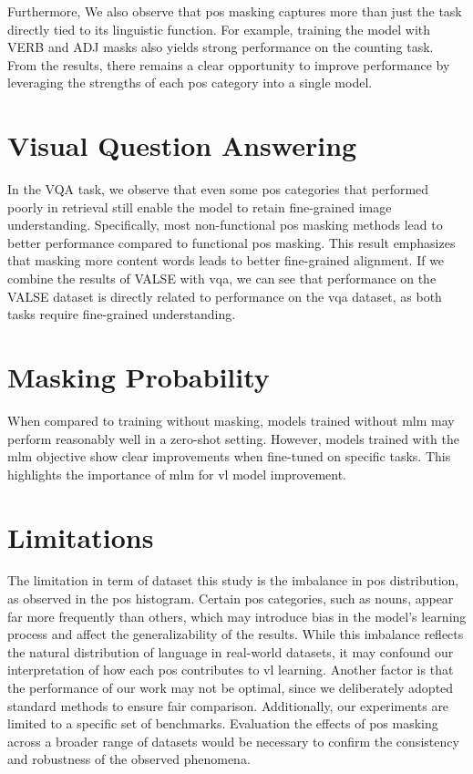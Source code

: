 Furthermore, We also observe that \acrshort{pos} masking captures more than just the task directly tied to its linguistic function.
For example, training the model with VERB and ADJ masks also yields strong performance on the counting task.
From the results, there remains a clear opportunity to improve performance by leveraging the strengths of each \acrshort{pos} category into a single model.

\section{Visual Question Answering}
In the VQA task, we observe that even some \acrshort{pos} categories that performed poorly in retrieval still enable the model to retain fine-grained image understanding.
Specifically, most non-functional \acrshort{pos} masking methods lead to better performance compared to functional \acrshort{pos} masking.
This result emphasizes that masking more content words leads to better fine-grained alignment.
If we combine the results of VALSE with \acrshort{vqa}, we can see that performance on the VALSE dataset is directly related to performance on the \acrshort{vqa} dataset, as both tasks require fine-grained understanding.

\section{Masking Probability}
When compared to training without masking, models trained without \acrshort{mlm} may perform reasonably well in a zero-shot setting.
However, models trained with the \acrshort{mlm} objective show clear improvements when fine-tuned on specific tasks.
This highlights the importance of \acrshort{mlm} for \acrshort{vl} model improvement.

\section{Limitations}
The limitation in term of dataset this study is the imbalance in \acrshort{pos} distribution, as observed in the \acrshort{pos} histogram.
Certain \acrshort{pos} categories, such as nouns, appear far more frequently than others, which may introduce bias in the model’s learning process and affect the generalizability of the results.
While this imbalance reflects the natural distribution of language in real-world datasets, it may confound our interpretation of how each \acrshort{pos} contributes to \Acrshort{vl} learning.
Another factor is that the performance of our work may not be optimal, since we deliberately adopted standard methods to ensure fair comparison.
Additionally, our experiments are limited to a specific set of benchmarks. 
Evaluation the effects of \acrshort{pos} masking across a broader range of datasets would be necessary to confirm the consistency and robustness of the observed phenomena.

